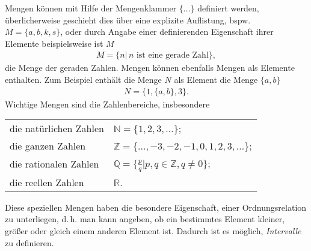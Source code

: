 Mengen können mit Hilfe der Mengenklammer $\{\hdots\}$ definiert werden, überlicherweise geschieht dies über eine explizite Auflistung, bspw. $M=\{a,b,k,s\}$, oder durch Angabe einer definierenden Eigenschaft ihrer Elemente beispielsweise ist $M$
\begin{align}
    M = \{n |\, n \text{ ist eine gerade Zahl}\},
\end{align}
die Menge der geraden Zahlen. Mengen können ebenfalls Mengen als Elemente enthalten. Zum Beispiel enthält die Menge $N$ als Element die Menge $\{a,b\}$
\begin{align}
    N = \{1,\{a,b\}, 3\}.
\end{align}
Wichtige Mengen sind die Zahlenbereiche, insbesondere 
\begin{table}[htp]
    \centering
    \begin{tabular}{l l}
        die natürlichen Zahlen & $\mathbb{N} = \{1,2,3,\hdots\}$;\\
        die ganzen Zahlen & $\mathbb{Z} = \{\hdots,-3,-2,-1,0,1,2,3,\hdots\}$;\\
        die rationalen Zahlen & $\mathbb{Q} = \{\frac{p}{q} | p,q \in \mathbb{Z}, q\neq 0\}$;\\
        die reellen Zahlen & $\mathbb{R}$.
    \end{tabular}
\end{table}

Diese speziellen Mengen haben die besondere Eigenschaft, einer Ordnungsrelation zu unterliegen, d.\,h. man kann angeben, ob ein bestimmtes Element kleiner, größer oder gleich einem anderen Element ist. Dadurch ist es möglich, \emph{Intervalle} zu definieren.

\begin{figure}[htp]
    \centering
\end{figure}

